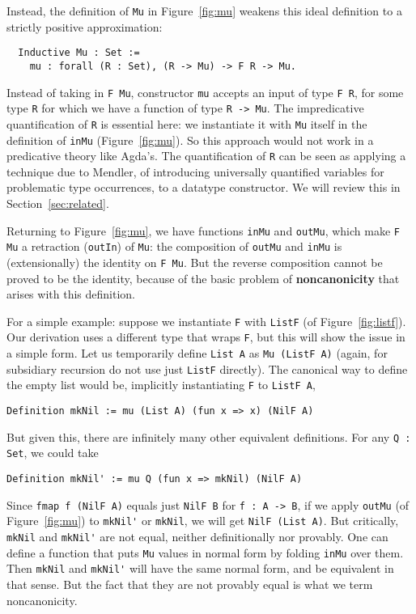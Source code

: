 \documentclass[a4paper,USenglish]{lipics-v2021}
\begin{document}
Instead, the definition of \verb|Mu| in Figure~\ref{fig:mu} weakens
this ideal definition to a strictly positive approximation:
\begin{verbatim}
  Inductive Mu : Set := 
    mu : forall (R : Set), (R -> Mu) -> F R -> Mu.
\end{verbatim}
\noindent Instead of taking in \verb|F Mu|, constructor \verb|mu|
accepts an input of type \verb|F R|, for some type \verb|R| for which
we have a function of type \verb|R -> Mu|.  The impredicative
quantification of \verb|R| is essential here: we instantiate it with
\verb|Mu| itself in the definition of \verb|inMu|
(Figure~\ref{fig:mu}).  So this approach would not work in a
predicative theory like Agda's.  The quantification of \verb|R| can be
seen as applying a technique due to Mendler, of introducing
universally quantified variables for problematic type occurrences, to
a datatype constructor.  We will review this in
Section~\ref{sec:related}.

Returning to Figure~\ref{fig:mu}, we have functions \verb|inMu| and
\verb|outMu|, which make \verb|F Mu| a retraction (\verb|outIn|) of
\verb|Mu|: the composition of \verb|outMu| and \verb|inMu| is
(extensionally) the identity on \verb|F Mu|.  But the reverse
composition cannot be proved to be the identity, because of the basic
problem of \textbf{noncanonicity} that arises with this definition.

For a simple example: suppose we instantiate \verb|F| with
\verb|ListF| (of Figure~\ref{fig:listf}).  Our derivation uses a
different type that wraps \verb|F|, but this will show the issue in a
simple form.  Let us temporarily define \verb|List A| as
\verb|Mu (ListF A)| (again, for subsidiary recursion do not use just
\verb|ListF| directly).  The canonical way to define the empty list
would be, implicitly instantiating \verb|F| to \verb|ListF A|,
\begin{verbatim}
Definition mkNil := mu (List A) (fun x => x) (NilF A)
\end{verbatim}
\noindent But given this, there are infinitely many other equivalent
definitions.  For any \verb|Q : Set|, we could take
\begin{verbatim}
Definition mkNil' := mu Q (fun x => mkNil) (NilF A)
\end{verbatim}
\noindent Since \verb|fmap f (NilF A)| equals just \verb|NilF B| for
\verb|f : A -> B|, if we apply \verb|outMu| (of Figure~\ref{fig:mu})
to \verb|mkNil'| or \verb|mkNil|, we will get \verb|NilF (List A)|.
But critically, \verb|mkNil| and \verb|mkNil'| are not equal, neither
definitionally nor provably.  One can define a function that puts
\verb|Mu| values in normal form by folding \verb|inMu| over them.
Then \verb|mkNil| and \verb|mkNil'| will have the same normal form,
and be equivalent in that sense.  But the fact that they are not
provably equal is what we term noncanonicity.  
\end{document}
